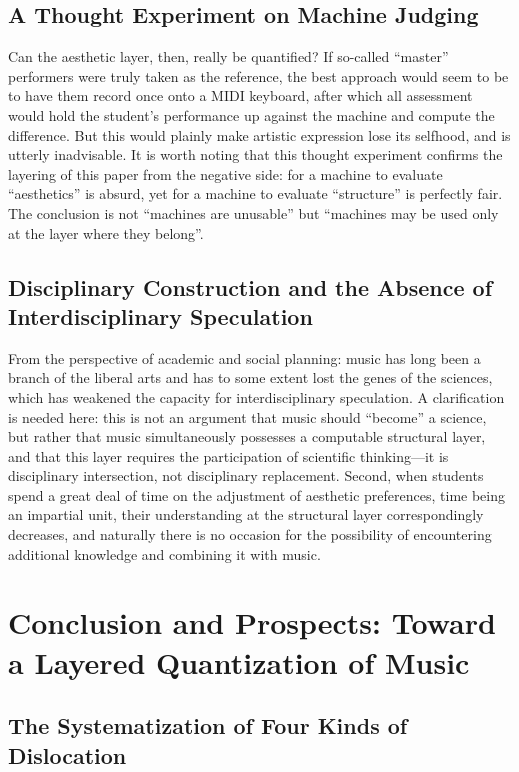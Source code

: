 \documentclass[11pt,a4paper]{article}
\begin{document}
\subsection{A Thought Experiment on Machine Judging}

Can the aesthetic layer, then, really be quantified? If so-called ``master'' performers
were truly taken as the reference, the best approach would seem to be to have them record
once onto a MIDI keyboard, after which all assessment would hold the student's performance
up against the machine and compute the difference. But this would plainly make artistic
expression lose its selfhood, and is utterly inadvisable. It is worth noting that this
thought experiment confirms the layering of this paper from the negative side: for a
machine to evaluate ``aesthetics'' is absurd, yet for a machine to evaluate ``structure''
is perfectly fair. The conclusion is not ``machines are unusable'' but ``machines may be
used only at the layer where they belong''.

\subsection{Disciplinary Construction and the Absence of Interdisciplinary Speculation}

From the perspective of academic and social planning: music has long been a branch of the
liberal arts and has to some extent lost the genes of the sciences, which has weakened the
capacity for interdisciplinary speculation. A clarification is needed here: this is not an
argument that music should ``become'' a science, but rather that music simultaneously
possesses a computable structural layer, and that this layer requires the participation of
scientific thinking---it is disciplinary intersection, not disciplinary replacement.
Second, when students spend a great deal of time on the adjustment of aesthetic
preferences, time being an impartial unit, their understanding at the structural layer
correspondingly decreases, and naturally there is no occasion for the possibility of
encountering additional knowledge and combining it with music.

\section{Conclusion and Prospects: Toward a Layered Quantization of Music}

\subsection{The Systematization of Four Kinds of Dislocation}
\end{document}
